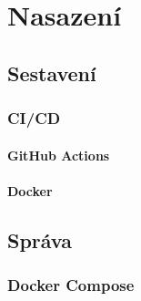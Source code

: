 \chapter{Nasazení}

\section{Sestavení}
\subsection{CI/CD}
    \subsubsection{GitHub Actions}
    \subsubsection{Docker}

\section{Správa}
\subsection{Docker Compose}